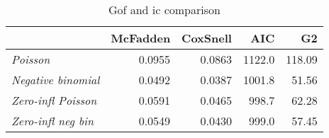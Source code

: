 \begin{table}[!h]

\caption{\label{tab:gof_ic_comparison}Gof and ic comparison}
\centering
\fontsize{9}{11}\selectfont
\begin{tabular}[t]{>{}lrrrr}
\toprule
  & McFadden & CoxSnell & AIC & G2\\
\midrule
\em{Poisson} & 0.0955 & 0.0863 & 1122.0 & 118.09\\
\em{Negative binomial} & 0.0492 & 0.0387 & 1001.8 & 51.56\\
\em{Zero-infl Poisson} & 0.0591 & 0.0465 & 998.7 & 62.28\\
\em{Zero-infl neg bin} & 0.0549 & 0.0430 & 999.0 & 57.45\\
\bottomrule
\end{tabular}
\end{table}
